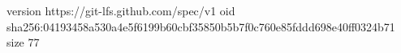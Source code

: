 version https://git-lfs.github.com/spec/v1
oid sha256:04193458a530a4e5f6199b60cbf35850b5b7f0c760e85fddd698e40ff0324b71
size 77
